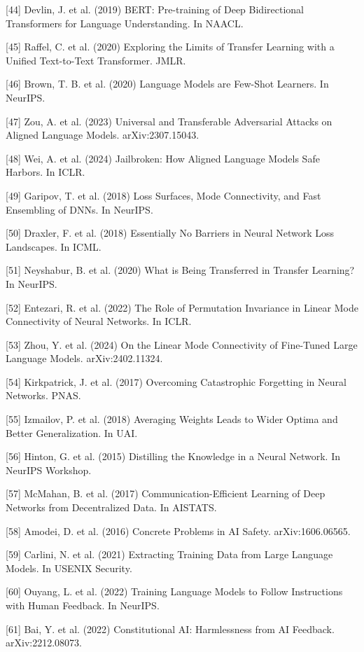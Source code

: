 \documentclass{article}
\begin{document}
{[44] Devlin, J. et al. (2019) BERT: Pre-training of Deep Bidirectional Transformers for Language Understanding. In NAACL.

[45] Raffel, C. et al. (2020) Exploring the Limits of Transfer Learning with a Unified Text-to-Text Transformer. JMLR.

[46] Brown, T. B. et al. (2020) Language Models are Few-Shot Learners. In NeurIPS.

[47] Zou, A. et al. (2023) Universal and Transferable Adversarial Attacks on Aligned Language Models. arXiv:2307.15043.

[48] Wei, A. et al. (2024) Jailbroken: How Aligned Language Models Safe Harbors. In ICLR.

[49] Garipov, T. et al. (2018) Loss Surfaces, Mode Connectivity, and Fast Ensembling of DNNs. In NeurIPS.

[50] Draxler, F. et al. (2018) Essentially No Barriers in Neural Network Loss Landscapes. In ICML.

[51] Neyshabur, B. et al. (2020) What is Being Transferred in Transfer Learning? In NeurIPS.

[52] Entezari, R. et al. (2022) The Role of Permutation Invariance in Linear Mode Connectivity of Neural Networks. In ICLR.

[53] Zhou, Y. et al. (2024) On the Linear Mode Connectivity of Fine-Tuned Large Language Models. arXiv:2402.11324.

[54] Kirkpatrick, J. et al. (2017) Overcoming Catastrophic Forgetting in Neural Networks. PNAS.

[55] Izmailov, P. et al. (2018) Averaging Weights Leads to Wider Optima and Better Generalization. In UAI.

[56] Hinton, G. et al. (2015) Distilling the Knowledge in a Neural Network. In NeurIPS Workshop.

[57] McMahan, B. et al. (2017) Communication-Efficient Learning of Deep Networks from Decentralized Data. In AISTATS.

[58] Amodei, D. et al. (2016) Concrete Problems in AI Safety. arXiv:1606.06565.

[59] Carlini, N. et al. (2021) Extracting Training Data from Large Language Models. In USENIX Security.

[60] Ouyang, L. et al. (2022) Training Language Models to Follow Instructions with Human Feedback. In NeurIPS.

[61] Bai, Y. et al. (2022) Constitutional AI: Harmlessness from AI Feedback. arXiv:2212.08073.

}
\end{document}

